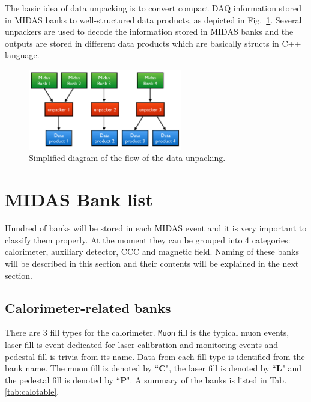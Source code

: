 The basic idea of data unpacking is to convert compact DAQ information stored in MIDAS banks to well-structured data products, as depicted in Fig.~\ref{fig:DataUnpacking}. Several unpackers are used to decode the information stored in MIDAS banks and the outputs are stored in different data products which are basically structs in C++ language.

\begin{figure}[htbp]
\centering
\includegraphics[width=0.6\textwidth]{pics/DataUnpacking.pdf} 
\caption{Simplified diagram of the flow of the data unpacking.}\label{fig:DataUnpacking}
\end{figure}

\newpage
\section{MIDAS Bank list}

Hundred of banks will be stored in each MIDAS event and it is very important to classify them properly. At the moment they can be grouped into 4 categories: calorimeter, auxiliary detector, CCC and magnetic field. Naming of these banks will be described in this section and their contents will be explained in the next section.

\subsection{Calorimeter-related banks}

There are 3 fill types for the calorimeter. \verb+Muon+ fill is the typical muon events, laser fill is event dedicated for laser calibration and monitoring events and pedestal fill is trivia from its name. Data from each fill type is identified from the bank name. The muon fill is denoted by ``\textbf{C}", the laser fill is denoted by ``\textbf{L}" and the pedestal fill is denoted by ``\textbf{P}". A summary of the banks is listed in Tab. \ref{tab:calotable}.


